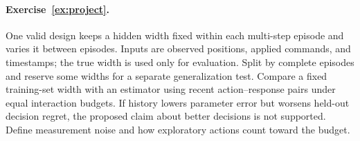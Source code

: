 \paragraph{Exercise~\ref{ex:project}.} One valid design keeps a hidden width fixed within each multi-step episode and varies it between episodes. Inputs are observed positions, applied commands, and timestamps; the true width is used only for evaluation. Split by complete episodes and reserve some widths for a separate generalization test. Compare a fixed training-set width with an estimator using recent action--response pairs under equal interaction budgets. If history lowers parameter error but worsens held-out decision regret, the proposed claim about better decisions is not supported. Define measurement noise and how exploratory actions count toward the budget.
